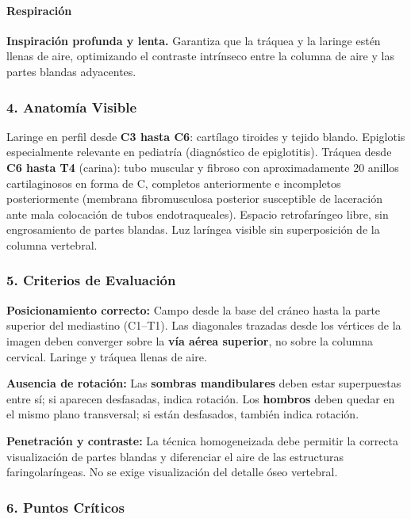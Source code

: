 	\paragraph{Respiración}
	\textbf{Inspiración profunda y lenta.} Garantiza que la tráquea y la laringe estén llenas de aire, optimizando el contraste intrínseco entre la columna de aire y las partes blandas adyacentes.
	
	\subsubsection*{4. Anatomía Visible}
	
	Laringe en perfil desde \textbf{C3 hasta C6}: cartílago tiroides y tejido blando. Epiglotis especialmente relevante en pediatría (diagnóstico de epiglotitis). Tráquea desde \textbf{C6 hasta T4} (carina): tubo muscular y fibroso con aproximadamente 20 anillos cartilaginosos en forma de C, completos anteriormente e incompletos posteriormente (membrana fibromusculosa posterior susceptible de laceración ante mala colocación de tubos endotraqueales). Espacio retrofaríngeo libre, sin engrosamiento de partes blandas. Luz laríngea visible sin superposición de la columna vertebral.
	
	\subsubsection*{5. Criterios de Evaluación}
	
	\textbf{Posicionamiento correcto:} Campo desde la base del cráneo hasta la parte superior del mediastino (C1--T1). Las diagonales trazadas desde los vértices de la imagen deben converger sobre la \textbf{vía aérea superior}, no sobre la columna cervical. Laringe y tráquea llenas de aire.
	
	\textbf{Ausencia de rotación:} Las \textbf{sombras mandibulares} deben estar superpuestas entre sí; si aparecen desfasadas, indica rotación. Los \textbf{hombros} deben quedar en el mismo plano transversal; si están desfasados, también indica rotación.
	
	\textbf{Penetración y contraste:} La técnica homogeneizada debe permitir la correcta visualización de partes blandas y diferenciar el aire de las estructuras faringolaríngeas. No se exige visualización del detalle óseo vertebral.
	
	\subsubsection*{6. Puntos Críticos}
	
